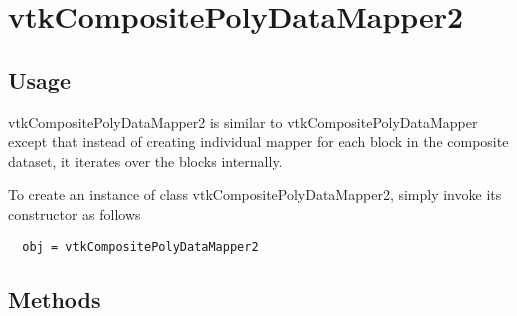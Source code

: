 \section{vtkCompositePolyDataMapper2}

\subsection{Usage}

 vtkCompositePolyDataMapper2 is similar to vtkCompositePolyDataMapper except
 that instead of creating individual mapper for each block in the composite
 dataset, it iterates over the blocks internally. 

To create an instance of class vtkCompositePolyDataMapper2, simply
invoke its constructor as follows
\begin{verbatim}
  obj = vtkCompositePolyDataMapper2
\end{verbatim}
\subsection{Methods}

